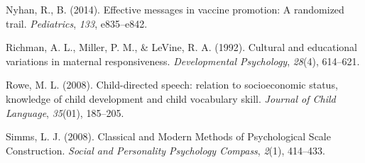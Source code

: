 \documentclass[floatsintext,man]{apa6}
\theoremstyle{definition}
\theoremstyle{definition}
\theoremstyle{definition}
\theoremstyle{remark}
\begin{document}
\hypertarget{ref-nyhan2014}{}
Nyhan, R., B. (2014). Effective messages in vaccine promotion: A
randomized trail. \emph{Pediatrics}, \emph{133}, e835--e842.

\hypertarget{ref-richman1992}{}
Richman, A. L., Miller, P. M., \& LeVine, R. A. (1992). Cultural and
educational variations in maternal responsiveness. \emph{Developmental
Psychology}, \emph{28}(4), 614--621.

\hypertarget{ref-rowe2008}{}
Rowe, M. L. (2008). Child-directed speech: relation to socioeconomic
status, knowledge of child development and child vocabulary skill.
\emph{Journal of Child Language}, \emph{35}(01), 185--205.

\hypertarget{ref-simms2008}{}
Simms, L. J. (2008). Classical and Modern Methods of Psychological Scale
Construction. \emph{Social and Personality Psychology Compass},
\emph{2}(1), 414--433.

\endgroup
\end{document}
